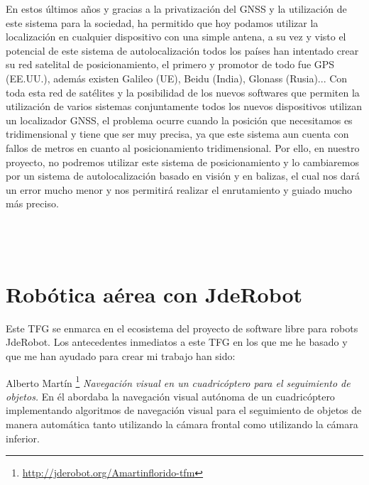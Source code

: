 \hspace{1cm} En estos últimos años y gracias a la privatización del GNSS y la utilización de este sistema para la sociedad, ha permitido que hoy podamos utilizar la localización en cualquier dispositivo con una simple antena, a su vez y visto el potencial de este sistema de autolocalización todos los países han intentado crear su red satelital de posicionamiento, el primero y promotor de todo fue GPS (EE.UU.), además existen Galileo (UE), Beidu (India), Glonass (Rusia)... Con toda esta red de satélites y la posibilidad de los nuevos softwares que permiten la utilización de varios sistemas conjuntamente todos los nuevos dispositivos utilizan un localizador GNSS, el problema ocurre cuando la posición que necesitamos es tridimensional y tiene que ser muy precisa, ya que este sistema aun cuenta con fallos de metros en cuanto al posicionamiento tridimensional. Por ello, en nuestro proyecto, no podremos utilizar este sistema de posicionamiento y lo cambiaremos por un sistema de autolocalización basado en visión y en balizas, el cual nos dará un error mucho menor y nos permitirá realizar el enrutamiento y guiado mucho más preciso.
\\
\\
\\
\\

\section{Robótica aérea con JdeRobot}
\hspace{1cm} Este TFG se enmarca en el ecosistema del proyecto de software libre para robots JdeRobot. Los antecedentes inmediatos a este TFG en los que me he basado y que me han ayudado para crear mi trabajo han sido:

\hspace{1cm} Alberto Martín \footnote{\url{http://jderobot.org/Amartinflorido-tfm}} \cite{AlbertoMartin} \textit{Navegación visual en un cuadricóptero para el seguimiento de objetos.} En él abordaba la navegación visual autónoma de un cuadricóptero implementando algoritmos de navegación visual para el seguimiento de objetos de manera automática tanto utilizando la cámara frontal como utilizando la cámara inferior.
\\

